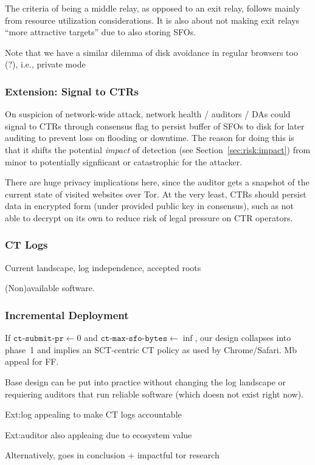 The criteria of being a middle relay, as opposed to an exit relay, follows
mainly from resource utilization considerations.  It is also about not making
exit relays ``more attractive targets'' due to also storing SFOs.

Note that we have a similar dilemma of disk avoidance in regular browsers too
(?), i.e., private mode

\subsubsection{Extension: Signal to CTRs}
On suspicion of network-wide attack, network health / auditors / DAs could
signal to CTRs through consensus flag to persist buffer of SFOs to disk for
later auditing to prevent loss on flooding or downtime. The reason for doing
this is that it shifts the potential \emph{impact} of detection (see
Section~\ref{sec:risk:impact}) from minor to potentially signfiicant or
catastrophic for the attacker.

There are huge privacy implications here, since the auditor gets a snapshot of
the current state of visited websites over Tor. At the very least, CTRs should
persist data in encrypted form (under provided public key in consensus), such as
not able to decrypt on its own to reduce risk of legal pressure on CTR
operators.

\subsubsection{CT Logs} \label{sec:discussion:logs}
Current landscape, log independence, accepted roots~\cite{ct-root-landscape}

(Non)available software.

\subsubsection{Incremental Deployment}
If $\texttt{ct-submit-pr} \gets 0$ and $\texttt{ct-max-sfo-bytes} \gets
\inf$, our design collapses into phase~1 and implies an SCT-centric CT policy
as used by Chrome/Safari.  Mb appeal for FF.

Base design can be put into practice without changing the log landscape or
requiering auditors that run reliable software (which doesn not exist right
now).

Ext:log appealing to make CT logs accountable

Ext:auditor also appleaing due to ecosystem value

Alternatively, goes in conclusion + impactful tor research

